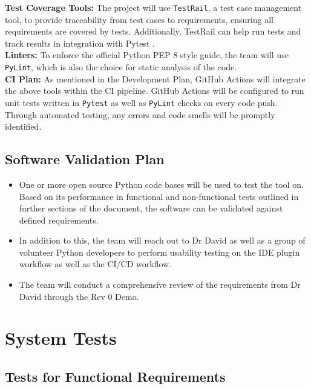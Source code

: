 \documentclass[12pt, titlepage]{article}
\begin{document}
\noindent\textbf{Test Coverage Tools:} The project will use \texttt{TestRail}, a test case management tool, to provide traceability from test cases to requirements, ensuring all requirements are covered by tests. Additionally, TestRail can help run tests and track results in integration with Pytest \citep{testrail}.\\


\noindent\textbf{Linters:} To enforce the official Python PEP 8 style guide, the team will use \texttt{PyLint}, which is also the choice for static analysis of the code.\\

\noindent\textbf{CI Plan:} As mentioned in the Development Plan, GitHub Actions will integrate the above tools within the CI pipeline. GitHub Actions will be configured to run unit tests written in \texttt{Pytest} as well as \texttt{PyLint} checks on every code push. Through automated testing, any errors and code smells will be promptly identified.\\

\subsection{Software Validation Plan}

\begin{itemize}
    \item One or more open source Python code bases will be used to test the tool on. Based on its performance in functional and non-functional tests outlined in further sections of the document, the software can be validated against defined requirements.
    \item In addition to this, the team will reach out to Dr David as well as a group of volunteer Python developers to perform usability testing on the IDE plugin workflow as well as the CI/CD workflow.
    \item The team will conduct a comprehensive review of the requirements from Dr David through the Rev 0 Demo.
\end{itemize}

\section{System Tests}

\subsection{Tests for Functional Requirements}
\end{document}
